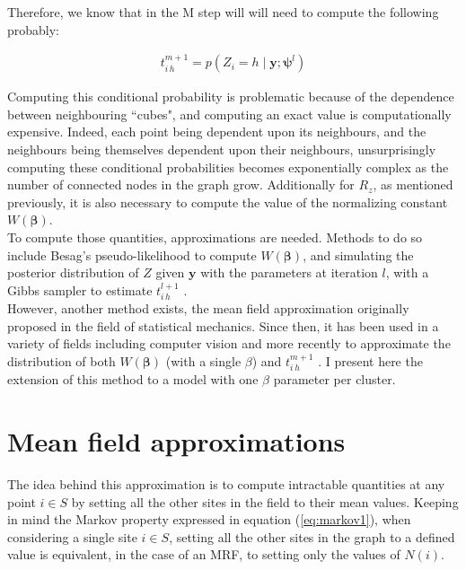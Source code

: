 Therefore, we know that in the M step will will need to compute the following probably:

\begin{align*}
t_{i\,h}^{m+1} = p(Z_i = h \mid \boldsymbol{y};\boldsymbol{\psi}^{l})
\end{align*}

Computing this conditional probability is problematic because of the dependence between neighbouring ``cubes", and computing an exact value is computationally expensive. Indeed, each point being dependent upon its neighbours, and the neighbours being themselves dependent upon their neighbours, unsurprisingly computing these conditional probabilities becomes exponentially complex as the number of connected nodes in the graph grow. Additionally for $R_z$, as mentioned previously, it is also necessary to compute the value of the normalizing constant $W(\boldsymbol{\beta})$.\\

To compute those quantities, approximations are needed. Methods to do so include Besag's pseudo-likelihood \cite{Besag75} to compute $W(\boldsymbol{\beta})$, and simulating the posterior distribution of $Z$ given $\boldsymbol{y}$ with the parameters at iteration $l$, with a Gibbs sampler to estimate $t_{i\,h}^{l+1}$ \cite{Chalmond89}.\\

However, another method exists, the mean field approximation originally proposed in the field of statistical mechanics. Since then, it has been used in a variety of fields including computer vision \cite{Yuille90} and more recently to approximate the distribution of both $W(\boldsymbol{\beta})$ (with a single $\beta$) and $t_{i\,h}^{m+1}$ \cite{Zhang92}. I present here the extension of this method to a model with one $\beta$ parameter per cluster.

\section{Mean field approximations}

The idea behind this approximation is to compute intractable quantities at any point $i \in S$ by setting all the other sites in the field to their mean values. Keeping in mind the Markov property expressed in equation (\ref{eq:markov1}), when considering a single site $i \in S$, setting all the other sites in the graph to a defined value is equivalent, in the case of an MRF, to setting only the values of $N(i)$.\\

